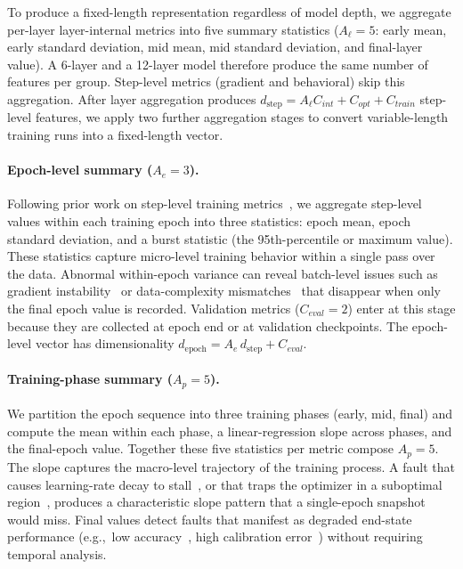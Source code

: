To produce a fixed-length representation regardless of model depth, we aggregate per-layer layer-internal metrics into five summary statistics ($A_\ell=5$: early mean, early standard deviation, mid mean, mid standard deviation, and final-layer value). A 6-layer and a 12-layer model therefore produce the same number of features per group. Step-level metrics (gradient and behavioral) skip this aggregation. After layer aggregation produces $d_{\text{step}} = A_\ell C_{int} + C_{opt} + C_{train}$ step-level features, we apply two further aggregation stages to convert variable-length training runs into a fixed-length vector.

\paragraph{Epoch-level summary ($A_e=3$).} Following prior work on step-level training metrics~\cite{ben2023testing,deeplocalize}, we aggregate step-level values within each training epoch into three statistics: epoch mean, epoch standard deviation, and a burst statistic (the 95th-percentile or maximum value). These statistics capture micro-level training behavior within a single pass over the data. Abnormal within-epoch variance can reveal batch-level issues such as gradient instability~\cite{ben2023testing} or data-complexity mismatches~\cite{deeplocalize} that disappear when only the final epoch value is recorded. Validation metrics ($C_{eval}=2$) enter at this stage because they are collected at epoch end or at validation checkpoints. The epoch-level vector has dimensionality $d_{\text{epoch}} = A_e \, d_{\text{step}} + C_{eval}$.

\paragraph{Training-phase summary ($A_p=5$).} We partition the epoch sequence into three training phases (early, mid, final) and compute the mean within each phase, a linear-regression slope across phases, and the final-epoch value. Together these five statistics per metric compose $A_p=5$. The slope captures the macro-level trajectory of the training process. A fault that causes learning-rate decay to stall~\cite{autotrainer}, or that traps the optimizer in a suboptimal region~\cite{deeplocalize}, produces a characteristic slope pattern that a single-epoch snapshot would miss. Final values detect faults that manifest as degraded end-state performance (e.g.,~low accuracy~\cite{deepfd}, high calibration error~\cite{ben2023testing}) without requiring temporal analysis.

